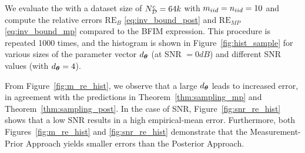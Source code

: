 We evaluate the \name{} with a dataset size of $N_{\mathcal{D}}^{{c}}=64k$ with $m_{iid}=n_{iid}=10$ 
and compute the relative errors 
$\mathrm{RE}_{B}$ \eqref{eq:inv_bound_post} and $\mathrm{RE}_{MP}$ \eqref{eq:inv_bound_mp}
 compared to the BFIM expression. This procedure is repeated 1000 times, and the {histogram} is shown in Figure~\ref{fig:hist_sample} 
 for various sizes of the parameter vector ${d_{\bm{\theta}}}$ (at SNR $=0dB$) and different SNR values (with ${d_{\bm{\theta}}}=4$).

From Figure~\ref{fig:m_re_hist}, we observe that a large ${d_{\bm{\theta}}}$ leads to {increased} error, {in agreement with the predictions} 
in Theorem~\ref{thm:sampling_mp} and Theorem~\ref{thm:sampling_post}. In the case of SNR, Figure~\ref{fig:snr_re_hist} shows that a low SNR results in a high empirical-mean error. 
Furthermore, both Figures~\ref{fig:m_re_hist} and \ref{fig:snr_re_hist} demonstrate that the Measurement-Prior
Approach yields smaller errors than
the Posterior Approach. 


